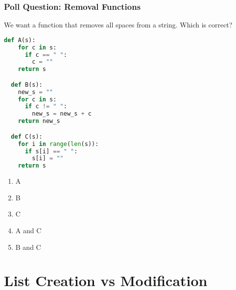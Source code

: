 \documentclass{beamer}
\begin{document}
%
%
\begin{frame}[fragile]
  \frametitle{Poll Question: Removal Functions}
  We want a function that removes all spaces from a string. Which is correct?\\
  \hfill
  \begin{minipage}{0.48\textwidth}
    \begin{lstlisting}[language=Python, autogobble, basicstyle=\tiny]
  def A(s):
    for c in s:
      if c == " ":
        c = ""
    return s

  def B(s):
    new_s = ""
    for c in s:
      if c != " ":
        new_s = new_s + c
    return new_s

  def C(s):
    for i in range(len(s)):
      if s[i] == " ":
        s[i] = ""
    return s\end{lstlisting}
  \end{minipage}
  \hfill
  \begin{minipage}{0.48\textwidth}
    \hfill
    \begin{enumerate}[A]
      \item A
      \item B
      \item C
      \item A and C
      \item B and C
    \end{enumerate}
  \end{minipage}
\end{frame}

\section{List Creation vs Modification}
\end{document}
